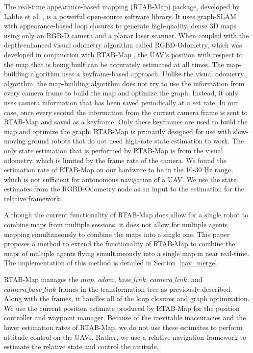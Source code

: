 \documentclass[letterpaper, 10 pt, conference]{ieeeconf}  %
\begin{document}
The real-time appearance-based mapping (RTAB-Map) package, developed by Labbe et al. \cite{Labbe2011a,Labbe2013,Labbe2019}, is a powerful open-source software library. It uses graph-SLAM with appearance-based loop closures to generate high-quality, dense 3D maps using only an RGB-D camera and a planar laser scanner. When coupled with the depth-enhanced visual odometry algorithm called RGBD-Odometry, which was developed in conjunction with RTAB-Map \cite{Labbe2019}, the UAV's position with respect to the map that is being built can be accurately estimated at all times. The map-building algorithm uses a keyframe-based approach. Unlike the visual odometry algorithm, the map-building algorithm does not try to use the information from every camera frame to build the map and optimize the graph. Instead, it only uses camera information that has been saved periodically at a set rate. In our case, once every second the information from the current camera frame is sent to RTAB-Map and saved as a keyframe. Only these keyframes are used to build the map and optimize the graph. RTAB-Map is primarily designed for use with slow-moving ground robots that do not need high-rate state estimation to work. The only state estimation that is performed by RTAB-Map is from the visual odometry, which is limited by the frame rate of the camera. We found the estimation rate of RTAB-Map on our hardware to be in the 10-30 Hz range, which is not sufficient for autonomous navigation of a UAV. We use the state estimates from the RGBD-Odometry node as an input to the estimation for the relative framework.

Although the current functionality of RTAB-Map does allow for a single robot to combine maps from multiple sessions, it does not allow for multiple agents mapping simultaneously to combine the maps into a single one. This paper proposes a method to extend the functionality of RTAB-Map to combine the maps of multiple agents flying simultaneously into a single map in near real-time. The implementation of this method is detailed in Section~\ref{nav_merge}.

RTAB-Map manages the $\mathit{map}$, $\mathit{odom}$, $\mathit{base\_link}$, $\mathit{camera\_link}$, and $\mathit{camera\_base\_link}$ frames in the transformation tree as previously described. Along with the frames, it handles all of the loop closures and graph optimization. We use the current position estimate produced by RTAB-Map for the position controller and waypoint manager. Because of the inevitable inaccuracies and the lower estimation rates of RTAB-Map, we do not use these estimates to perform attitude control on the UAVs. Rather, we use a relative navigation framework to estimate the relative state and control the attitude.
\end{document}
